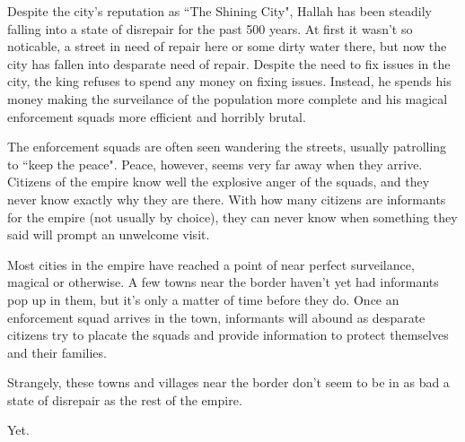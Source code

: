 Despite the city's reputation as ``The Shining City", Hallah has been steadily
falling into a state of disrepair for the past 500 years. At first it wasn't so
noticable, a street in need of repair here or some dirty water there, but
now the city has fallen into desparate need of repair. Despite the need to
fix issues in the city, the king refuses to spend any money on fixing issues.
Instead, he spends his money making the surveilance of the population more
complete and his magical enforcement squads more efficient and horribly brutal.

The enforcement squads are often seen wandering the streets, usually patrolling
to ``keep the peace". Peace, however, seems very far away when they arrive.
Citizens of the empire know well the explosive anger of the squads, and they
never know exactly why they are there. With how many citizens are informants
for the empire (not usually by choice), they can never know when something they
said will prompt an unwelcome visit.

Most cities in the empire have reached a point of near perfect surveilance,
magical or otherwise. A few towns near the border haven't yet had informants
pop up in them, but it's only a matter of time before they do. Once an
enforcement squad arrives in the town, informants will abound as desparate
citizens try to placate the squads and provide information to protect
themselves and their families.

Strangely, these towns and villages near the border don't seem to be in as bad
a state of disrepair as the rest of the empire.

Yet.
